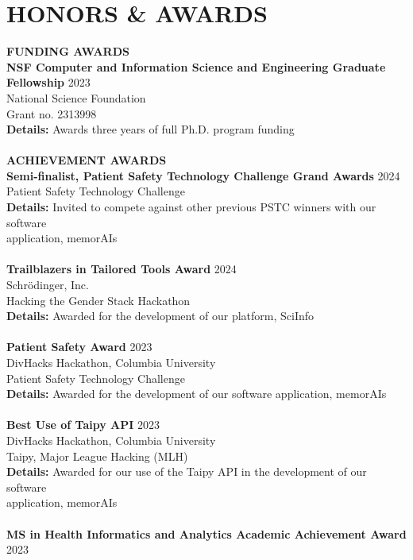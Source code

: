 \documentclass[a4paper,12pt]{article}
\begin{document}
{\section*{HONORS \& AWARDS}
\textbf{FUNDING AWARDS} \\[0.5em]
\textbf{NSF Computer and Information Science and Engineering Graduate Fellowship} \hfill 2023\\
National Science Foundation\\
Grant no. 2313998 \\
\textbf{Details:} Awards three years of full Ph.D. program funding \\
\\
\textbf{ACHIEVEMENT AWARDS} \\[0.5em]
\textbf{Semi-finalist, Patient Safety Technology Challenge Grand Awards} \hfill 2024\\
Patient Safety Technology Challenge\\
\textbf{Details:} Invited to compete against other previous PSTC winners with our software \\application, memorAIs \\
\\
\textbf{Trailblazers in Tailored Tools Award} \hfill 2024\\
Schrödinger, Inc.\\
Hacking the Gender Stack Hackathon\\
\textbf{Details:} Awarded for the development of our platform, SciInfo \\
\\
\textbf{Patient Safety Award} \hfill 2023\\
DivHacks Hackathon, Columbia University\\
Patient Safety Technology Challenge\\
\textbf{Details:} Awarded for the development of our software application, memorAIs \\
\\
\textbf{Best Use of Taipy API} \hfill 2023\\
DivHacks Hackathon, Columbia University\\
Taipy, Major League Hacking (MLH)\\
\textbf{Details:} Awarded for our use of the Taipy API in the development of our software \\application, memorAIs \\
\\
\textbf{MS in Health Informatics and Analytics Academic Achievement Award} \hfill 2023\\
}
\end{document}
